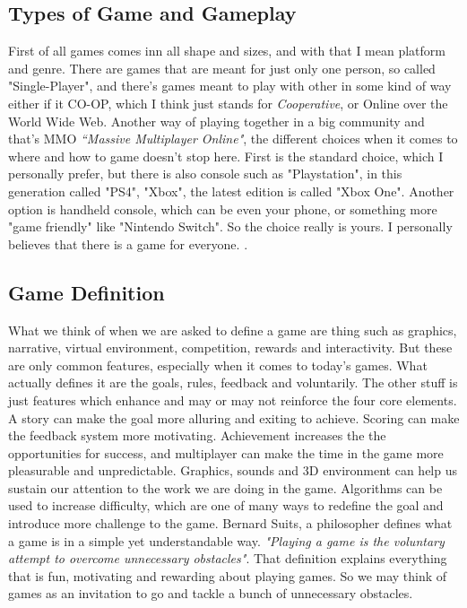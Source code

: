 \subsection{Types of Game and Gameplay}
\label{sec:GameAndGaePlay}
First of all games comes inn all shape and sizes, and with that I mean platform and genre. There are games that are meant for just only one person, so called "Single-Player", and there's games meant to play with other in some kind of way either if it CO-OP, which I think just stands for \textit{Cooperative}, or Online over the World Wide Web. Another way of playing together in a big community and that's MMO \textit{``Massive Multiplayer Online"}, the different choices when it comes to where and how to game doesn't stop here. First is the standard choice, which I personally prefer, but there is also console such as "Playstation", in this generation called "PS4", "Xbox", the latest edition is called "Xbox One". Another option is handheld console, which can be even your phone, or something more "game friendly" like "Nintendo Switch". So the choice really is yours. I personally believes that there is a game for everyone.
\cite[P.~20]{RealityIsBroken}.

\subsection{Game Definition}
\label{sec:GameDefenition}
What we think of when we are asked to define a game are thing such as graphics, narrative, virtual environment, competition, rewards and interactivity. But these are only common features, especially when it comes to today's games. What actually defines it are the goals, rules, feedback and voluntarily. The other stuff is just features which enhance and may or may not reinforce the four core elements. A story can make the goal more alluring and exiting to achieve. Scoring can make the feedback system more motivating. Achievement increases the the opportunities for success, and multiplayer can make the time in the game more pleasurable and unpredictable. Graphics, sounds and 3D environment can help us sustain our attention to the work we are doing in the game. Algorithms can be used to increase difficulty, which are one of many ways to redefine the goal and introduce more challenge to the game. Bernard Suits, a philosopher defines what a game is in a simple yet understandable way. \textit{"Playing a game is the voluntary attempt to overcome unnecessary obstacles"}.\cite[P.~55]{TheGrasshopper} That definition explains everything that is fun, motivating and rewarding about playing games. So we may think of games as an invitation to go and tackle a bunch of unnecessary obstacles.\cite[P.22]{RealityIsBroken} 

